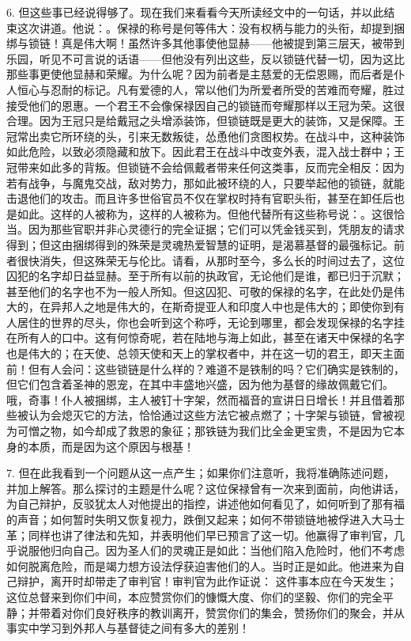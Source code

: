 6. 但这些事已经说得够了。现在我们来看看今天所读经文中的一句话，并以此结束这次讲道。他说：。保禄的称号是何等伟大：没有权柄与能力的头衔，却提到捆绑与锁链！真是伟大啊！虽然许多其他事使他显赫——他被提到第三层天，被带到乐园，听见不可言说的话语——但他没有列出这些，反以锁链代替一切，因为这比那些事更使他显赫和荣耀。为什么呢？因为前者是主慈爱的无偿恩赐，而后者是仆人恒心与忍耐的标记。凡有爱德的人，常以他们为所爱者所受的苦难而夸耀，胜过接受他们的恩惠。一个君王不会像保禄因自己的锁链而夸耀那样以王冠为荣。这很合理。因为王冠只是给戴冠之头增添装饰，但锁链既是更大的装饰，又是保障。王冠常出卖它所环绕的头，引来无数叛徒，怂恿他们贪图权势。在战斗中，这种装饰如此危险，以致必须隐藏和放下。因此君王在战斗中改变外表，混入战士群中；王冠带来如此多的背叛。但锁链不会给佩戴者带来任何这类事，反而完全相反：因为若有战争，与魔鬼交战，敌对势力，那如此被环绕的人，只要举起他的锁链，就能击退他们的攻击。而且许多世俗官员不仅在掌权时持有官职头衔，甚至在卸任后也是如此。这样的人被称为，这样的人被称为。但他代替所有这些称号说：。这很恰当。因为那些官职并非心灵德行的完全证据；它们可以凭金钱买到，凭朋友的请求得到；但这由捆绑得到的殊荣是灵魂热爱智慧的证明，是渴慕基督的最强标记。前者很快消失，但这殊荣无与伦比。请看，从那时至今，多么长的时间过去了，这位囚犯的名字却日益显赫。至于所有以前的执政官，无论他们是谁，都已归于沉默；甚至他们的名字也不为一般人所知。但这囚犯、可敬的保禄的名字，在此处仍是伟大的，在异邦人之地是伟大的，在斯奇提亚人和印度人中也是伟大的；即使你到有人居住的世界的尽头，你也会听到这个称呼，无论到哪里，都会发现保禄的名字挂在所有人的口中。这有何惊奇呢，若在陆地与海上如此，甚至在诸天中保禄的名字也是伟大的；在天使、总领天使和天上的掌权者中，并在这一切的君王，即天主面前！但有人会问：这些锁链是什么样的？难道不是铁制的吗？它们确实是铁制的，但它们包含着圣神的恩宠，在其中丰盛地兴盛，因为他为基督的缘故佩戴它们。哦，奇事！仆人被捆绑，主人被钉十字架，然而福音的宣讲日日增长！并且借着那些被认为会熄灭它的方法，恰恰通过这些方法它被点燃了；十字架与锁链，曾被视为可憎之物，如今却成了救恩的象征；那铁链为我们比全金更宝贵，不是因为它本身的本质，而是因为这个原因与根基！\par

7. 但在此我看到一个问题从这一点产生；如果你们注意听，我将准确陈述问题，并加上解答。那么探讨的主题是什么呢？这位保禄曾有一次来到面前，向他讲话，为自己辩护，反驳犹太人对他提出的指控，讲述他如何看见了，如何听到了那有福的声音；如何暂时失明又恢复视力，跌倒又起来；如何不带锁链地被俘进入大马士革；同样也讲了律法和先知，并表明他们早已预言了这一切。他赢得了审判官，几乎说服他归向自己。因为圣人们的灵魂正是如此：当他们陷入危险时，他们不考虑如何脱离危险，而是竭力想方设法俘获迫害他们的人。当时正是如此。他进来为自己辩护，离开时却带走了审判官！审判官为此作证说： 这件事本应在今天发生；这位总督来到你们中间，本应赞赏你们的慷慨大度、你们的坚毅、你们的完全平静；并带着对你们良好秩序的教训离开，赞赏你们的集会，赞扬你们的聚会，并从事实中学习到外邦人与基督徒之间有多大的差别！\par

